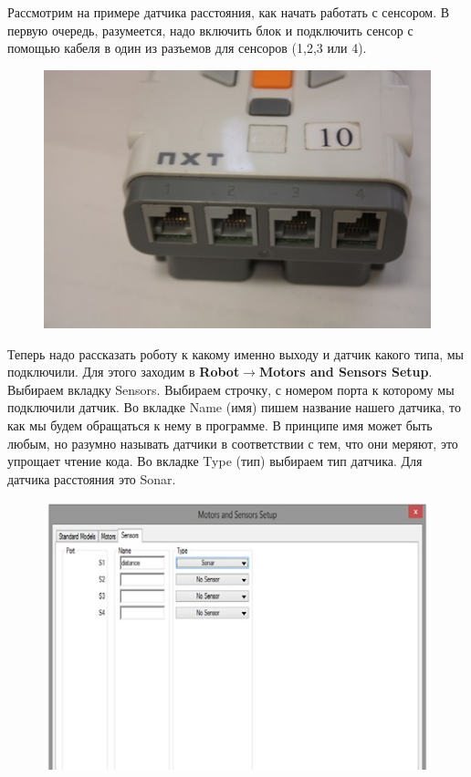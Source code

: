 Рассмотрим на примере датчика расстояния, как начать работать с сенсором. В первую очередь, разумеется, надо включить блок и подключить сенсор с помощью кабеля в один из разъемов для сенсоров (1,2,3 или 4).

\begin{figure}[h!]
	\begin{center}
		\includegraphics[width=1\linewidth]{chapters/chapter14/images/1}
		\caption{}
		\label{ris:image14x1}
	\end{center}
\end{figure}

Теперь надо рассказать роботу к какому именно выходу и датчик какого типа, мы подключили. Для этого заходим в {\bfseries Robot\(\to\)Motors and Sensors Setup}. Выбираем вкладку Sensors. Выбираем строчку, с номером порта к которому мы подключили датчик. Во вкладке Name (имя) пишем название нашего датчика, то как мы будем обращаться к нему в программе. В принципе имя может быть любым, но разумно называть датчики в соответствии с  тем,  что они меряют, это упрощает чтение кода. Во вкладке Type (тип) выбираем тип датчика. Для датчика расстояния это Sonar.
\clearpage
\begin{figure}[h!]
	\begin{center}
		\includegraphics[width=1\linewidth]{chapters/chapter14/images/2}
		\caption{}
		\label{ris:image14x2}
	\end{center}
\end{figure}	

